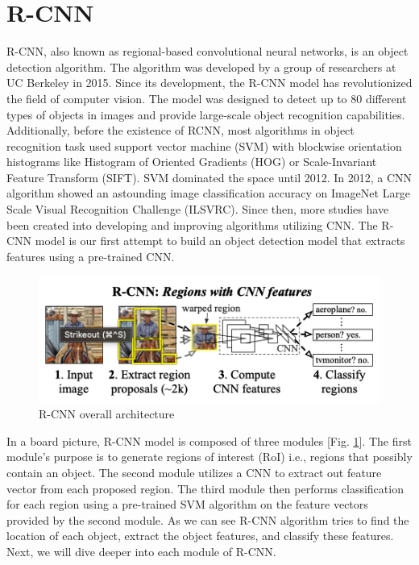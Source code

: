 \section{R-CNN}

R-CNN, also known as regional-based convolutional neural networks, is an object detection algorithm. The algorithm was developed by a group of researchers at UC Berkeley in 2015. Since its development, the R-CNN model has revolutionized the field of computer vision. The model was designed to detect up to 80 different types of objects in images and provide large-scale object recognition capabilities. Additionally, before the existence of RCNN, most algorithms in object recognition task used support vector machine (SVM) with blockwise orientation histograms like Histogram of Oriented Gradients (HOG) or Scale-Invariant Feature Transform (SIFT). SVM dominated the space until 2012. In 2012, a CNN algorithm showed an astounding image classification accuracy on ImageNet Large Scale Visual Recognition Challenge (ILSVRC). Since then, more studies have been created into developing and improving algorithms utilizing CNN. The R-CNN model is our first attempt to build an object detection model that extracts features using a pre-trained CNN.

\begin{figure}[!ht]
    \centering
    \includegraphics[width=4.5in]{figures/rcnn_archiet.png}
    \caption{R-CNN overall architecture \cite{Girshick_R_CNN_2013}} \label{fig:rcnn_archiet}
\end{figure}

In a board picture, R-CNN model is composed of three modules [Fig. \ref{fig:rcnn_archiet}]. The first module's purpose is to generate regions of interest (RoI) i.e., regions that possibly contain an object. The second module utilizes a CNN to extract out feature vector from each proposed region. The third module then performs classification for each region using a pre-trained SVM algorithm on the feature vectors provided by the second module. As we can see R-CNN algorithm tries to find the location of each object, extract the object features, and classify these features. Next, we will dive deeper into each module of R-CNN.

